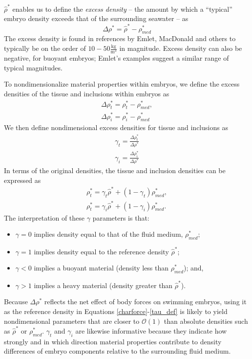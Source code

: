 \documentclass[10pt,a4paper]{article}
\def\non{\nonumber}
\begin{document}
$\hat{\rho}^*$ enables us to define the \textit{excess density} -- the amount by which a ``typical'' embryo density exceeds that of the surrounding seawater -- as
\begin{equation}
	\Delta \rho^* = \hat{\rho}^* - \rho_{med}^*
\end{equation}
The excess density is found in references by Emlet, MacDonald and others to typically be on the order of $10-50 \frac{\mathrm{kg}}{\mathrm{m^3}}$ in magnitude.
Excess density can also be negative, for buoyant embryos; Emlet's examples suggest a similar range of typical magnitudes.

To nondimensionalize material properties within embryos, we define the excess densities of the tissue and inclusions within embryos as
\begin{eqnarray}\label{dens1}
	\Delta \rho_t^* = \rho_t^* - \rho_{med}^*, \non \\
	\Delta \rho_i^* = \rho_i^* - \rho_{med}^*
\end{eqnarray}
We then define nondimensional excess densities for tissue and inclusions as
\begin{eqnarray}\label{dens2}
	\gamma_t = \frac{\Delta \rho_t^*}{\Delta \rho^*} \non \\
	\gamma_i = \frac{\Delta \rho_i^*}{\Delta \rho^*}
\end{eqnarray}
In terms of the original densities, the tissue and inclusion densities can be expressed as 
\begin{eqnarray}\label{dens3}
	\rho_t^* = \gamma_t \hat{\rho}^* + (1 - \gamma_t) \rho_{med}^*, \non \\
	\rho_t^* = \gamma_i \hat{\rho}^* + (1 - \gamma_i) \rho_{med}^*.
\end{eqnarray}
The interpretation of these $\gamma$ parameters is that:
\begin{itemize}
	\item $\gamma = 0$ implies density equal to that of the fluid medium, $\rho_{med}^*$;
	\item $\gamma = 1$ implies density equal to the reference density $\hat{\rho}^*$;
	\item $\gamma < 0$ implies a buoyant material (density less than $\rho_{med}^*$); and,
	\item $\gamma > 1$ implies a heavy material (density greater than $\hat{\rho}^*$).
\end{itemize}

Because $\Delta \rho^*$ reflects the net effect of body forces on swimming embryos, using it as the reference density in Equations \ref{charforce}-\ref{tau_def} is likely to yield nondimensional parameters that are closer to $\mathcal{O}(1)$ than absolute densities such as $\hat{\rho}^*$ or $\rho_{med}^*$.
$\gamma_t$ and $\gamma_i$ are likewise informative because they indicate how strongly and in which direction material properties contribute to density differences of embryo components relative to the surrounding fluid medium. 
\end{document}
